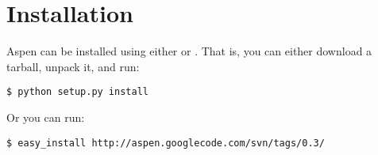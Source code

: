 \chapter{Installation \label{installation}}

Aspen can be installed using either  or .
That is, you can either download a tarball, unpack it, and run:

\begin{verbatim}
$ python setup.py install
\end{verbatim}

Or you can run:

\begin{verbatim}
$ easy_install http://aspen.googlecode.com/svn/tags/0.3/
\end{verbatim}
